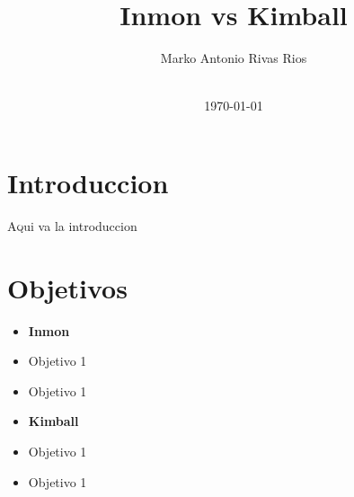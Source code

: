 \documentclass[twoside,twocolumn]{article}
\title{Inmon vs Kimball}
\author{Marko Antonio Rivas Rios\\  \\
}
\date{\today}
\begin{document}
\maketitle


\section{Introduccion}
\lettrine[nindent=0em,lines=3]{A}qui va la introduccion






\section{Objetivos}

\begin{itemize}

\item \textbf{Inmon}
\\
\item Objetivo 1
\item Objetivo 1
\\

\item \textbf{Kimball}
\\
\item Objetivo 1
\item Objetivo 1
\\

\end{itemize}


\end{document}

